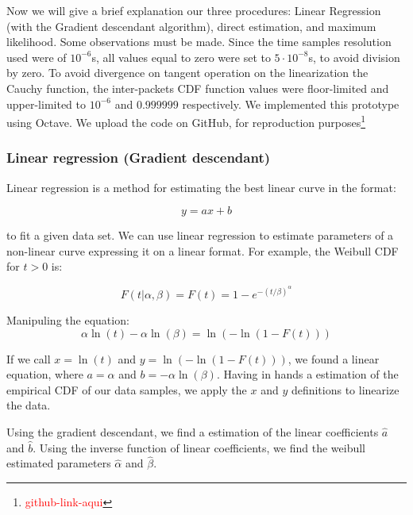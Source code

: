 Now we will give a brief explanation our three procedures: Linear Regression (with the  Gradient descendant algorithm), direct estimation, and maximum likelihood. Some observations must be made. Since the time samples resolution used were of $10^{-6}$s, all values equal to zero were set to  $5\cdot10^{-8}$s, to avoid division by zero. To avoid divergence on tangent operation on the linearization the Cauchy function, the inter-packets CDF function values were floor-limited and upper-limited to  $10^{-6}$ and $0.999999$ respectively. We implemented this prototype using Octave. We upload the code on GitHub, for reproduction purposes\footnote{\textcolor{red}{github-link-aqui}}





\subsubsection{Linear regression (Gradient descendant)}

Linear regression is a method for estimating the best linear curve in the format:

\begin{equation}
y = ax + b
\end{equation}

to fit a given data set. We can use linear regression to estimate parameters of a non-linear curve expressing it on a linear format. For example, the Weibull CDF for $t > 0$ is:

\begin{equation}
F(t|\alpha, \beta) = F(t) = 1 - e^{-(t/\beta)^{\alpha}}
\end{equation}

Manipuling the equation:
\begin{equation}
\alpha\ln{(t)} - \alpha\ln{(\beta)} = \ln{(-\ln{(1 - F(t))})}
\end{equation}

If we call $x = \ln{(t)}$ and $y = \ln{(-\ln{(1 - F(t))})}$, we found a linear equation, where $a = \alpha$ and $b = -\alpha\ln{(\beta)}$. Having in hands a estimation of the empirical CDF of our data samples, we apply the $x$ and $y$ definitions to linearize the data. 

Using the gradient descendant, we find a estimation of the linear coefficients $\hat{a}$ and $\hat{b}$. Using the inverse function of linear coefficients, we find the weibull estimated parameters $\hat{\alpha}$ and $\hat{\beta}$.

